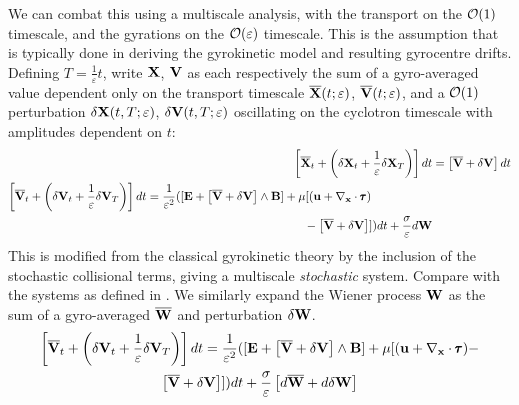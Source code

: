     We can combat this using a multiscale analysis, with the transport on the $\mathcal{O}(1)$ timescale, and the gyrations on the $\mathcal{O}(\varepsilon)$ timescale. This is the assumption that is typically done in deriving the gyrokinetic model and resulting gyrocentre drifts. Defining $T = \frac{1}{\varepsilon}t$, write $\mathbf{X}$, $\mathbf{V}$ as each respectively the sum of a gyro-averaged value dependent only on the transport timescale $\overline{\mathbf{X}}(t; \varepsilon)$, $\overline{\mathbf{V}}(t; \varepsilon)$, and a $\mathcal{O}(1)$ perturbation $\delta\mathbf{X}(t, T; \varepsilon)$, $\delta\mathbf{V}(t, T; \varepsilon)$ oscillating on the cyclotron timescale with amplitudes dependent on $t$:
    \begin{align}
          \label{multiscale position SDE}  \left[\overline{\mathbf{X}}_{t} + \left(\delta\mathbf{X}_{t} + \frac{1}{\varepsilon}\delta\mathbf{X}_{T}\right)\right]dt  &= 
 \left[\overline{\mathbf{V}} + \delta\mathbf{V}\right]dt  \\
        \begin{split}
            \left[\overline{\mathbf{V}}_{t} + \left(\delta\mathbf{V}_{t} + \frac{1}{\varepsilon}\delta\mathbf{V}_{T}\right)\right]dt  &=  \frac{1}{\varepsilon^{2}}([\mathbf{E} + \left[\overline{\mathbf{V}} + \delta\mathbf{V}\right]\wedge\mathbf{B}] + \mu[(\mathbf{u} + \nabla_{\mathbf{x}}\cdot\pmb{\mathsf{\tau}})  \\
            &  \;\;\;\;\;\;\;\;\;\;\;\;\;\;\;\;\;\;\;\;\;\;\;\;\;\;\;\;\;\;\;\;\;\;\;\;\;\;\;\;\;\;\;\;\;\;\;\;  - \left[\overline{\mathbf{V}} + \delta\mathbf{V}\right]])dt + \frac{\sigma}{\varepsilon}d\mathbf{W}
        \end{split}
    \end{align}
    \BA{[Ref]} This is modified from the classical gyrokinetic theory by the inclusion of the stochastic collisional terms, giving a multiscale \emph{stochastic} system. Compare with the systems as defined in . We similarly expand the Wiener process $\mathbf{W}$ as the sum of a gyro-averaged $\overline{\mathbf{W}}$ and perturbation $\delta\mathbf{W}$. 
    \begin{multline}\label{multiscale velocity SDE}
        \left[\overline{\mathbf{V}}_{t} + \left(\delta\mathbf{V}_{t} + \frac{1}{\varepsilon}\delta\mathbf{V}_{T}\right)\right]dt  =  \frac{1}{\varepsilon^{2}}([\mathbf{E} + \left[\overline{\mathbf{V}} + \delta\mathbf{V}\right]\wedge\mathbf{B}] + \mu[(\mathbf{u} + \nabla_{\mathbf{x}}\cdot\pmb{\mathsf{\tau}}) -  \\
        \left[\overline{\mathbf{V}} + \delta\mathbf{V}\right]])dt + \frac{\sigma}{\varepsilon}\left[d\overline{\mathbf{W}} + d\delta\mathbf{W}\right]
    \end{multline}
